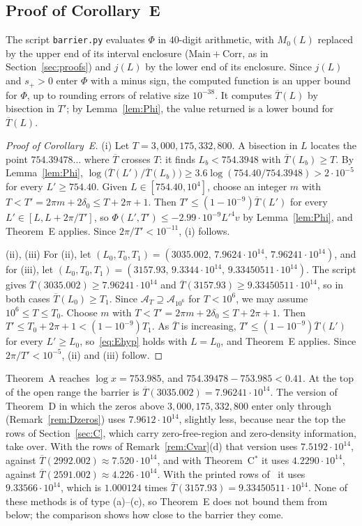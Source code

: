 \documentclass{amsart}
\theoremstyle{definition}
\theoremstyle{remark}
\theoremstyle{plain}
\numberwithin{equation}{section}
\newcommand{\HRH}{3{,}000{,}175{,}332{,}800}
\newcommand{\Main}{\mathrm{Main}}
\newcommand{\Corr}{\mathrm{Corr}}
\newcommand{\cA}{\mathcal{A}}
\newcommand{\Tb}{\overline{T}}
\newcommand{\TDolduse}{9.33566\cdot10^{14}}
\newcommand{\Cstar}{C$^*$}
\begin{document}
\subsection{Proof of Corollary~E}\label{sec:corE}

The script \texttt{barrier.py} evaluates $\Phi$ in $40$-digit arithmetic, with $M_0(L)$ replaced by the upper end of its interval enclosure ($\Main+\Corr$, as in Section~\ref{sec:proofs}) and $j(L)$ by the lower end of its enclosure. Since $j(L)$ and $s_+>0$ enter $\Phi$ with a minus sign, the computed function is an upper bound for $\Phi$, up to rounding errors of relative size $10^{-38}$. It computes $\Tb(L)$ by bisection in $T'$; by Lemma~\ref{lem:Phi}, the value returned is a lower bound for $\Tb(L)$.

\begin{proof}[Proof of Corollary~E]
(i) Let $T=\HRH$. A bisection in $L$ locates the point $754.39478\ldots$ where $\Tb$ crosses $T$: it finds $L_b<754.3948$ with $\Tb(L_b)\ge T$. By Lemma~\ref{lem:Phi}, $\log\bigl(\Tb(L')/\Tb(L_b)\bigr)\ge3.6\log(754.40/754.3948)>2\cdot10^{-5}$ for every $L'\ge754.40$. Given $L\in[754.40,10^4]$, choose an integer $m$ with $T<T'=2\pi m+2\delta_0\le T+2\pi+1$. Then $T'\le(1-10^{-9})\Tb(L')$ for every $L'\in[L,L+2\pi/T']$, so $\Phi(L',T')\le-2.99\cdot10^{-9}L'^4v$ by Lemma~\ref{lem:Phi}, and Theorem~E applies. Since $2\pi/T'<10^{-11}$, (i) follows.

(ii), (iii) For (ii), let $(L_0,T_0,T_1)=(3035.002,\,7.9624\cdot10^{14},\,7.96241\cdot10^{14})$, and for (iii), let $(L_0,T_0,T_1)=(3157.93,\,9.3344\cdot10^{14},\,9.33450511\cdot10^{14})$. The script gives $\Tb(3035.002)\ge7.96241\cdot10^{14}$ and $\Tb(3157.93)\ge9.33450511\cdot10^{14}$, so in both cases $\Tb(L_0)\ge T_1$. Since $\cA_T\supseteq\cA_{10^6}$ for $T<10^6$, we may assume $10^6\le T\le T_0$. Choose $m$ with $T<T'=2\pi m+2\delta_0\le T+2\pi+1$. Then $T'\le T_0+2\pi+1<(1-10^{-9})T_1$. As $\Tb$ is increasing, $T'\le(1-10^{-9})\Tb(L')$ for every $L'\ge L_0$, so~\eqref{eq:Ehyp} holds with $L=L_0$, and Theorem~E applies. Since $2\pi/T'<10^{-5}$, (ii) and (iii) follow.
\end{proof}

Theorem~A reaches $\log x=753.985$, and $754.39478-753.985<0.41$. At the top of the open range the barrier is $\Tb(3035.002)=7.96241\cdot10^{14}$. The version of Theorem~D in which the zeros above $\HRH$ enter only through~\cite{CH25} (Remark~\ref{rem:Dzeros}) uses $7.9612\cdot10^{14}$, slightly less, because near the top the rows of Section~\ref{sec:C}, which carry zero-free-region and zero-density information, take over. With the rows of Remark~\ref{rem:Cvar}(d) that version uses $7.5192\cdot10^{14}$, against $\Tb(2992.002)\approx7.520\cdot10^{14}$, and with Theorem~\Cstar{} it uses $4.2290\cdot10^{14}$, against $\Tb(2591.002)\approx4.226\cdot10^{14}$. With the printed rows of~\cite{FKS23} it uses $\TDolduse$, which is $1.000124$ times $\Tb(3157.93)=9.33450511\cdot10^{14}$. None of these methods is of type (a)--(c), so Theorem~E does not bound them from below; the comparison shows how close to the barrier they come.
\end{document}
